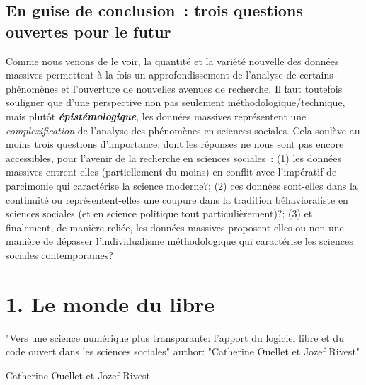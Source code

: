 \documentclass[
  letterpaper,
]{scrbook}
\begin{document}
\hypertarget{en-guise-de-conclusion-trois-questions-ouvertes-pour-le-futur}{%
\section{En guise de conclusion~: trois questions ouvertes pour le
futur}\label{en-guise-de-conclusion-trois-questions-ouvertes-pour-le-futur}}

Comme nous venons de le voir, la quantité et la variété nouvelle des
données massives permettent à la fois un approfondissement de l'analyse
de certains phénomènes et l'ouverture de nouvelles avenues de recherche.
Il faut toutefois souligner que d'une perspective non pas seulement
méthodologique/technique, mais plutôt \textbf{\emph{épistémologique}},
les données massives représentent une \emph{complexification} de
l'analyse des phénomènes en sciences sociales. Cela soulève au moins
trois questions d'importance, dont les réponses ne nous sont pas encore
accessibles, pour l'avenir de la recherche en sciences sociales~: (1)
les données massives entrent-elles (partiellement du moins) en conflit
avec l'impératif de parcimonie qui caractérise la science moderne?; (2)
ces données sont-elles dans la continuité ou représentent-elles une
coupure dans la tradition béhavioraliste en sciences sociales (et en
science politique tout particulièrement)?; (3) et finalement, de manière
reliée, les données massives proposent-elles ou non une manière de
dépasser l'individualisme méthodologique qui caractérise les sciences
sociales contemporaines?


\hypertarget{le-monde-du-libre}{%
\chapter{1. Le monde du libre}\label{le-monde-du-libre}}

\begin{center}

"Vers une science numérique plus transparante: l'apport du logiciel libre et du code ouvert dans les sciences sociales"
author: "Catherine Ouellet et Jozef Rivest"

Catherine Ouellet et Jozef Rivest

\end{center}
\end{document}
